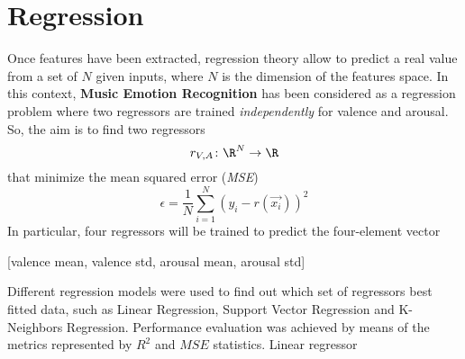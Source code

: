 \section{Regression} %
Once features have been extracted, regression theory allow to predict a real value from a set of $N$ given inputs, where $N$ is the dimension of the features space. In this context, \textbf{Music Emotion Recognition} has been considered as a regression problem where two regressors are trained \textit{independently} for valence and arousal. So, the aim is to find two regressors  
\[r_{V, A} \colon \R^{N} \to \R\]
that minimize the mean squared error (\textit{MSE})
\[ \epsilon = \frac{1}{N} \sum_{i =1}^{N} (y_i - r(\vec{x_i}))^2\]
In particular, four regressors will be trained to predict the four-element vector
\begin{center}
[valence mean, valence std, arousal mean, arousal std]
\end{center}
Different regression models were used to find out which set of regressors best fitted data, such as Linear Regression, Support Vector Regression and K-Neighbors Regression. Performance evaluation was achieved by means of the metrics represented by $R^2$ and $MSE$ statistics. Linear regressor 

